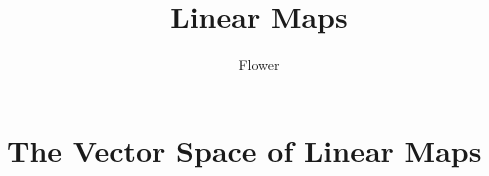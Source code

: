 \documentclass[
	12pt, %
]{fphw}
\title{Linear Maps} %
\author{Flower} %
\date{} %
\institute{University of Mars \\ Institute of Intergalactic Travel} %
\begin{document}
\maketitle %


\section{The Vector Space of Linear Maps}




\end{document}
